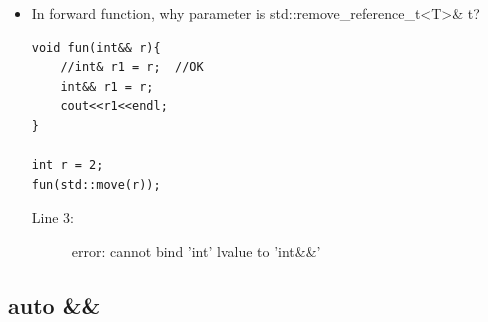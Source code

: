 \documentclass[a4paper,11pt,twoside]{book}
\begin{document}
\begin{itemize}
\begin{description}
	
\end{description}


	\item In forward function, why parameter is std::remove\_reference\_t<T>\& t?
\begin{lstlisting}
void fun(int&& r){
	//int& r1 = r;  //OK
	int&& r1 = r;  
	cout<<r1<<endl;
}

int r = 2;
fun(std::move(r));
\end{lstlisting}
\begin{description}
	\item[Line 3:] error: cannot bind 'int' lvalue to 'int\&\&'
\end{description}

\end{itemize}


\subsection{auto \&\&}
\end{document}
